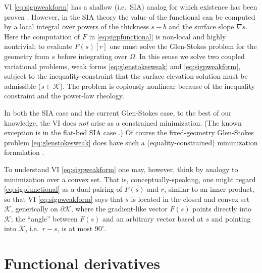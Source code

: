 \documentclass[letterpaper,final,12pt,reqno]{amsart}
\theoremstyle{claim}
\newcommand{\grad}{\nabla}
\numberwithin{equation}{section}
\numberwithin{figure}{section}
\numberwithin{table}{section}
\numberwithin{theorem}{section}
\begin{document}
VI \eqref{eq:sigpweakform} has a shallow (i.e.~SIA) analog for which existence has been proven \cite{JouvetBueler2012}.  However, in the SIA theory the value of the functional can be computed by a local integral over powers of the thickness $s-b$ and the surface slope $\grad s$.  Here the computation of $F$ in \eqref{eq:sigpfunctional} is non-local and highly nontrivial; to evaluate $F(s)[r]$ one must solve the Glen-Stokes problem for the geometry from $s$ before integrating over $\Omega$.  In this sense we solve two coupled variational problems, weak forms \eqref{eq:glenstokesweak} and \eqref{eq:sigpweakform}, subject to the inequality-constraint that the surface elevation solution must be admissible ($s \in \mathcal{K}$).  The problem is copiously nonlinear because of the inequality constraint and the power-law rheology.

In both the SIA case and the current Glen-Stokes case, to the best of our knowledge, the VI does \emph{not} arise as a constrained minimization.  (The known exception is in the flat-bed SIA case \cite{JouvetBueler2012}.)  Of course the fixed-geometry Glen-Stokes problem \eqref{eq:glenstokesweak} does have such a (equality-constrained) minimization formulation \cite{Elmanetal2014,JouvetRappaz2011}.

To understand VI \eqref{eq:sigpweakform} one may, however, think by analogy to minimization over a convex set.  That is, conceptually-speaking, one might regard \eqref{eq:sigpfunctional} as a dual pairing of $F(s)$ and $r$, similar to an inner product, so that VI \eqref{eq:sigpweakform} says that $s$ is located in the closed and convex set $\mathcal{K}$, generically on $\partial\mathcal{K}$, where the gradient-like vector $F(s)$ points directly into $\mathcal{K}$; the ``angle'' between $F(s)$ and an arbitrary vector based at $s$ and pointing into $\mathcal{K}$, i.e.~$r-s$, is at most $90^\circ$.


\section{Functional derivatives} \label{sec:deriv}
\end{document}
